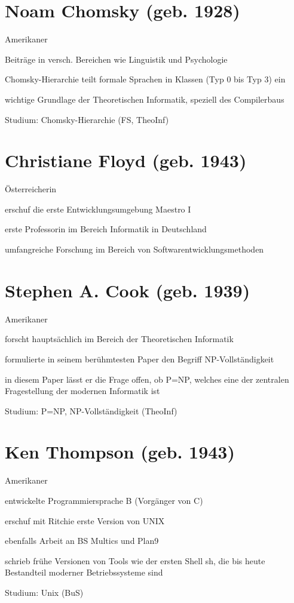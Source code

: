 \documentclass[a4paper,12pt]{report}
\begin{document}
\section*{Noam Chomsky (geb. 1928)}
\begin{itemize*}
	\item Amerikaner
	\item Beiträge in versch. Bereichen wie Linguistik und Psychologie
	\item Chomsky-Hierarchie teilt formale Sprachen in Klassen (Typ 0 bis Typ 3) ein
	\item wichtige Grundlage der Theoretischen Informatik, speziell des Compilerbaus
	\item Studium: Chomsky-Hierarchie (FS, TheoInf)
\end{itemize*}

\section*{Christiane Floyd (geb. 1943)}
\begin{itemize*}
	\item Österreicherin
	\item erschuf die erste Entwicklungsumgebung Maestro I
	\item erste Professorin im Bereich Informatik in Deutschland
	\item umfangreiche Forschung im Bereich von Softwarentwicklungsmethoden
\end{itemize*}

\section*{Stephen A. Cook (geb. 1939)}
\begin{itemize*}
	\item Amerikaner
	\item forscht hauptsächlich im Bereich der Theoretischen Informatik
	\item formulierte in seinem berühmtesten Paper den Begriff NP-Vollständigkeit
	\item in diesem Paper lässt er die Frage offen, ob P=NP, welches eine der zentralen Fragestellung der modernen Informatik ist
	\item Studium: P=NP, NP-Vollständigkeit (TheoInf)
\end{itemize*}

\section*{Ken Thompson (geb. 1943)}
\begin{itemize*}
	\item Amerikaner
	\item entwickelte Programmiersprache B (Vorgänger von C)
	\item erschuf mit Ritchie erste Version von UNIX
	\item ebenfalls Arbeit an BS Multics und Plan9
	\item schrieb frühe Versionen von Tools wie der ersten Shell sh, die bis heute Bestandteil moderner Betriebssysteme sind
	\item Studium: Unix (BuS)
\end{itemize*}
\end{document}
